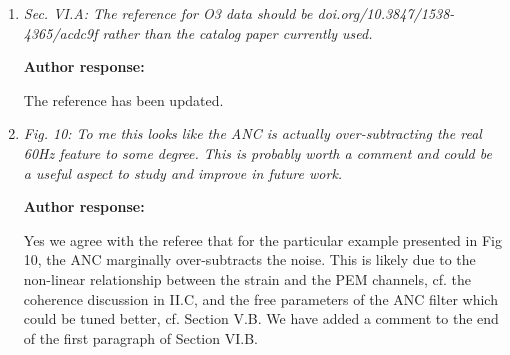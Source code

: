 \documentclass[10pt]{article}
\begin{document}
\begin{enumerate}
		\textbf{Author response:} 
		
		Yes we agree that this sentence as written is obscure. We have updated the sentence in the manuscript to be clearer. 
		

	\item \textit{Sec. VI.A: The reference for O3 data should be
	doi.org/10.3847/1538-4365/acdc9f
	rather than the catalog paper currently used.}

	\textbf{Author response:} 
	
	The reference has been updated.
	
	\item \textit{Fig. 10: To me this looks like the ANC is actually over-subtracting the real 60Hz feature to some degree. This is probably worth a comment and could be a useful aspect to study and improve in future work.}
	
		\textbf{Author response:} 
		
		Yes we agree with the referee that for the particular example presented in Fig 10, the ANC marginally over-subtracts the noise. This is likely due to the non-linear relationship between the strain and the PEM channels, cf. the coherence discussion in II.C, and the free parameters of the ANC filter which could be tuned better, cf. Section V.B. We have added a comment to the end of the first paragraph of Section VI.B.
	
\end{enumerate}
\end{document}
